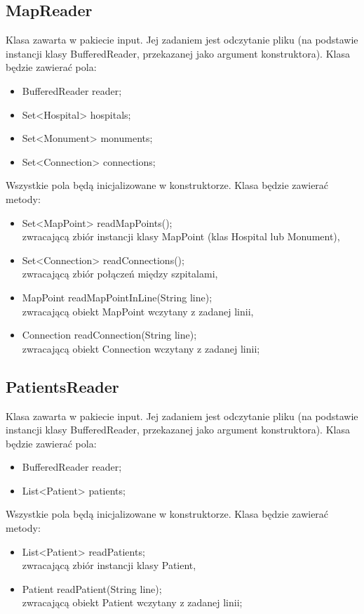 \documentclass{article}
\begin{document}
    \subsection{MapReader}
    Klasa zawarta w pakiecie input. Jej zadaniem jest odczytanie pliku (na podstawie instancji klasy BufferedReader, przekazanej jako argument konstruktora).
    Klasa będzie zawierać pola:
    \begin{itemize}
        \item BufferedReader reader;
        \item Set<Hospital> hospitals;
        \item Set<Monument> monuments;
        \item Set<Connection> connections;
    \end{itemize}
    Wszystkie pola będą inicjalizowane w konstruktorze.
    Klasa będzie zawierać metody:
    \begin{itemize}
        \item Set<MapPoint> readMapPoints(); \\
        zwracającą zbiór instancji klasy MapPoint (klas Hospital lub Monument),

        \item Set<Connection> readConnections(); \\
        zwracającą zbiór połączeń między szpitalami,

        \item MapPoint readMapPointInLine(String line); \\
        zwracającą obiekt MapPoint wczytany z zadanej linii,

        \item Connection readConnection(String line); \\
        zwracającą obiekt Connection wczytany z zadanej linii;
    \end{itemize}

    \subsection{PatientsReader}
    Klasa zawarta w pakiecie input. Jej zadaniem jest odczytanie pliku (na podstawie instancji klasy BufferedReader, przekazanej jako argument konstruktora).
    Klasa będzie zawierać pola:
    \begin{itemize}
        \item BufferedReader reader;
        \item List<Patient> patients;
    \end{itemize}
    Wszystkie pola będą inicjalizowane w konstruktorze.
    Klasa będzie zawierać metody:
    \begin{itemize}
        \item List<Patient> readPatients; \\
        zwracającą zbiór instancji klasy Patient,

        \item Patient readPatient(String line); \\
        zwracającą obiekt Patient wczytany z zadanej linii;
    \end{itemize}
\end{document}
